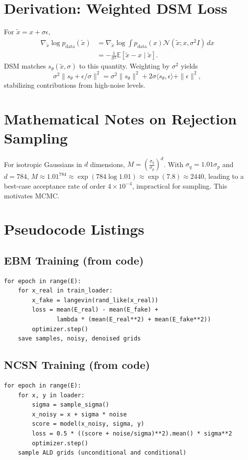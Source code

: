 \documentclass[a4paper,12pt]{article}
\begin{document}
\section{Derivation: Weighted DSM Loss}
For $\tilde{x} = x + \sigma \epsilon$,
\begin{align}
    \nabla_{\tilde{x}} \log p_{\text{data}}(\tilde{x}) &= \nabla_{\tilde{x}} \log \int p_{\text{data}}(x) \mathcal{N}(\tilde{x}; x, \sigma^2 I) \, dx \\
    &= -\frac{1}{\sigma^2} \mathbb{E}[ \tilde{x} - x \mid \tilde{x} ].
\end{align}
DSM matches $s_\theta(\tilde{x}, \sigma)$ to this quantity. Weighting by $\sigma^2$ yields
\begin{equation}
    \sigma^2 \big\| s_\theta + \epsilon/\sigma \big\|^2 = \sigma^2 \|s_\theta\|^2 + 2 \sigma \langle s_\theta, \epsilon \rangle + \|\epsilon\|^2,
\end{equation}
stabilizing contributions from high-noise levels.

\section{Mathematical Notes on Rejection Sampling}
For isotropic Gaussians in $d$ dimensions, $M = \left(\frac{\sigma_q}{\sigma_p}\right)^d$. With $\sigma_q = 1.01\sigma_p$ and $d=784$, $M \approx 1.01^{784} \approx \exp(784 \log 1.01) \approx \exp(7.8) \approx 2440$, leading to a best-case acceptance rate of order $4 \times 10^{-4}$, impractical for sampling. This motivates MCMC.

\section{Pseudocode Listings}
\subsection{EBM Training (from code)}
\begin{verbatim}
for epoch in range(E):
    for x_real in train_loader:
        x_fake = langevin(rand_like(x_real))
        loss = mean(E_real) - mean(E_fake) +
               lambda * (mean(E_real**2) + mean(E_fake**2))
        optimizer.step()
    save samples, noisy, denoised grids
\end{verbatim}
\subsection{NCSN Training (from code)}
\begin{verbatim}
for epoch in range(E):
    for x, y in loader:
        sigma = sample_sigma()
        x_noisy = x + sigma * noise
        score = model(x_noisy, sigma, y)
        loss = 0.5 * ((score + noise/sigma)**2).mean() * sigma**2
        optimizer.step()
    sample ALD grids (unconditional and conditional)
\end{verbatim}
\end{document}
